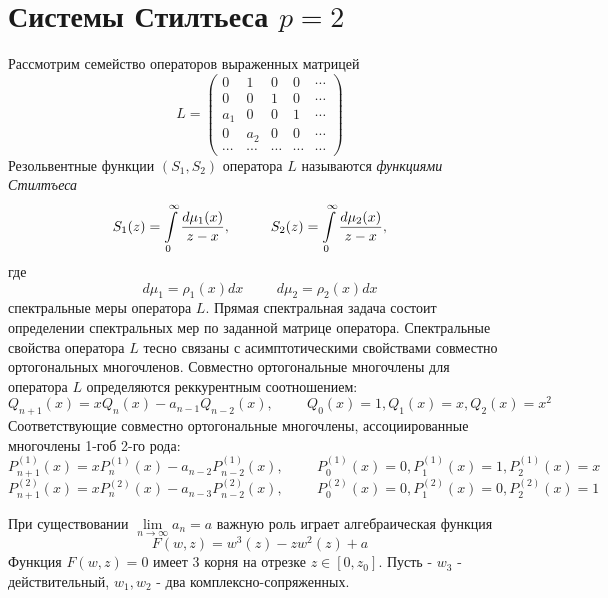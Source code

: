 \documentclass{report}
\begin{document}
\section{Системы Стилтьеса $p=2$}
Рассмотрим семейство операторов выраженных матрицей
\begin{equation}
L = \left(\begin{array}{ccccccc}
0 & 1 & 0 & 0 & \cdots \\
0 & 0 & 1 & 0 & \cdots \\
a_1 & 0 & 0 & 1 & \cdots \\
0 & a_2 & 0 & 0 & \cdots \\
\cdots & \cdots & \cdots & \cdots & \cdots 
\end{array}\right)
\end{equation}
Резольвентные функции $(S_1,S_2)$ оператора $L$ называются \emph {функциями Стилтъеса} 
$$
S_1(z) = \int\limits_{0}^{\infty} \frac{d\mu_1(x)}{z-x}, \hspace{1 cm} 
S_2(z) = \int\limits_{0}^{\infty} \frac{d\mu_2(x)}{z-x}, \hspace{0.5cm} 
$$
где 
$$
d\mu_1 = \rho_1(x) dx \hspace{1cm} d\mu_2 = \rho_2(x) dx
$$ 
спектральные меры оператора $L$.
Прямая спектральная задача состоит определении спектральных мер по заданной матрице оператора. 
Спектральные свойства оператора $L$ тесно связаны с асимптотическими свойствами совместно ортогональных многочленов. Совместно ортогональные многочлены для оператора  $L$ определяются реккурентным соотношением:
$$
Q_{n+1}(x)=xQ_n(x)-a_{n-1}Q_{n-2}(x), \hspace{1cm} Q_0(x)=1, Q_1(x)=x, Q_2(x)=x^2
$$
Соответствующие совместно ортогональные многочлены, ассоциированные многочлены 1-гоб 2-го рода:
$$
P^{(1)}_{n+1}(x)=xP^{(1)}_n(x)-a_{n-2}P^{(1)}_{n-2}(x), \hspace{1cm} P^{(1)}_0(x)=0, P^{(1)}_1(x)=1, P^{(1)}_2(x)=x
$$
$$
P^{(2)}_{n+1}(x)=xP^{(2)}_n(x)-a_{n-3}P^{(2)}_{n-2}(x), \hspace{1cm} P^{(2)}_0(x)=0, P^{(2)}_1(x)=0, P^{(2)}_2(x)=1
$$

При существовании $\lim \limits_{n \rightarrow \infty} a_n=a$ важную роль играет алгебраическая функция
$$
F(w,z)=w^3(z)-zw^2(z)+a 
$$
Функция $F(w,z)=0$ имеет 3 корня на отрезке $z\in [0, z_0]$. Пусть - $w_3$ - действительный, $w_1, w_2$ - два комплексно-сопряженных.
\end{document}
